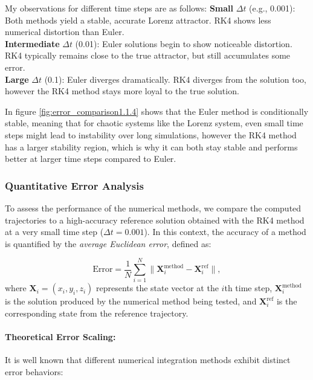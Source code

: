 My observations for different time steps are as follows:
\textbf{Small} $\Delta t$ (e.g., 0.001): Both methods yield a stable, accurate Lorenz attractor. RK4 shows less numerical distortion than Euler.\\

\textbf{Intermediate} $\Delta t$ (0.01): Euler solutions begin to show noticeable distortion. RK4 typically remains close to the true attractor, but still accumulates some error.\\

\textbf{Large} $\Delta t$ (0.1): Euler diverges dramatically. RK4 diverges from the solution too, however the RK4 method stays more loyal to the true solution.

In figure \ref{fig:error_comparison1.1.4} shows that the Euler method is conditionally stable, meaning that for chaotic systems like the Lorenz system, even small time steps might lead to instability over long simulations, however the RK4 method has a larger stability region, which is why it can both stay stable and performs better at larger time steps compared to Euler.

\subsubsection{Quantitative Error Analysis}

To assess the performance of the numerical methods, we compare the computed trajectories to a high-accuracy reference solution obtained with the RK4 method at a very small time step (\(\Delta t = 0.001\)). In this context, the accuracy of a method is quantified by the \emph{average Euclidean error}, defined as:

\[
\text{Error} = \frac{1}{N} \sum_{i=1}^{N} 
\bigl\| \mathbf{X}_i^{\text{method}} - \mathbf{X}_i^{\text{ref}} \bigr\|,
\]
%
where \(\mathbf{X}_i = (x_i, y_i, z_i)\) represents the state vector at the \(i\)th time step, \(\mathbf{X}_i^{\text{method}}\) is the solution produced by the numerical method being tested, and \(\mathbf{X}_i^{\text{ref}}\) is the corresponding state from the reference trajectory.




\paragraph{Theoretical Error Scaling:}
It is well known that different numerical integration methods exhibit distinct error behaviors:

